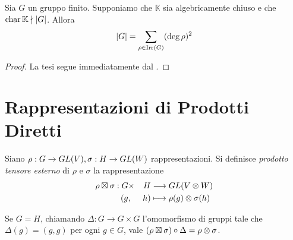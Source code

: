 \begin{corollary}
Sia $G$ un gruppo finito. Supponiamo che $\mathbb{K}$ sia algebricamente chiuso e che $\operatorname{char}\mathbb{K}\nmid |G|$. Allora
$$
|G|=\sum_{\rho\in\operatorname{Irr}(G)}(\deg\rho)^2
$$
\end{corollary}
\begin{proof}
La tesi segue immediatamente dal .
\end{proof}

\section{Rappresentazioni di Prodotti Diretti}

\begin{definition}
Siano $\rho:G\to GL(V),\allowbreak\sigma:H\to GL(W)$ rappresentazioni. Si definisce \emph{prodotto tensore esterno} di $\rho$ e $\sigma$ la rappresentazione
\begin{alignat*}{2}
\rho\boxtimes\sigma:G&\times &H&\longrightarrow GL(V\otimes W)\\
(g&,&h)&\longmapsto\rho(g)\otimes\sigma(h)
\end{alignat*}
\end{definition}

\begin{remark}
Se $G=H$, chiamando $\Delta:G\to G\times G$ l'omomorfismo di gruppi tale che $\Delta(g)=(g,g)$ per ogni $g\in G$, vale $(\rho\boxtimes\sigma)\circ\Delta=\rho\otimes\sigma$.
\end{remark}



